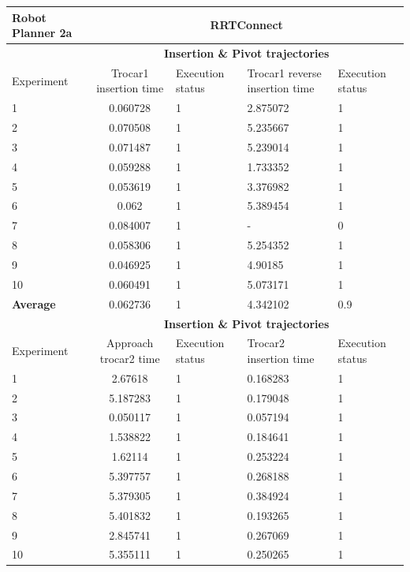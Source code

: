 \begin{longtable}{|p{2cm}|c|p{2cm}|p{2cm}|p{2cm}|}
\hline
Robot Planner 2a           & \multicolumn{4}{c}{\textbf{RRTConnect}}                                                                                                 \vline \\
\hline
                          & \multicolumn{4}{c}{\textbf{Insertion \& Pivot trajectories}}                     \vline \\
\hline
Experiment                & Trocar1 insertion time & Execution status & Trocar1 reverse insertion time & Execution status  \\
\hline
1	& 0.060728	& 1	& 2.875072	& 1 \\
2	& 0.070508	& 1	& 5.235667	& 1 \\
3	& 0.071487	& 1	& 5.239014	& 1 \\
4	& 0.059288	& 1	& 1.733352	& 1 \\
5	& 0.053619	& 1	& 3.376982	& 1 \\
6	& 0.062	& 1	& 5.389454	& 1 \\
7	& 0.084007	& 1	& -	& 0 \\
8	& 0.058306	& 1	& 5.254352	& 1 \\
9	& 0.046925	& 1	& 4.90185	& 1 \\
10	& 0.060491	& 1	& 5.073171	& 1 \\
\hline
\textbf{Average} & 	0.062736	& 1	& 4.342102	& 0.9 \\
\hline
                          & \multicolumn{4}{c}{\textbf{Insertion \& Pivot trajectories}}                     \vline \\
\hline
Experiment                & Approach trocar2 time & Execution status & Trocar2 insertion time & Execution status  \\
\hline
1 & 2.67618	& 1	& 0.168283	& 1 \\
2 & 5.187283	& 1	& 0.179048	& 1 \\
3 & 0.050117	& 1	& 0.057194	& 1 \\
4 & 1.538822	& 1	& 0.184641	& 1 \\
5 & 1.62114	& 1	& 0.253224	& 1 \\
6 & 5.397757	& 1	& 0.268188	& 1 \\
7 & 5.379305	& 1	& 0.384924	& 1 \\
8 & 5.401832	& 1	& 0.193265	& 1 \\
9 & 2.845741	& 1	& 0.267069	& 1 \\
10  & 5.355111	& 1	& 0.250265	& 1 \\

\end{longtable}

